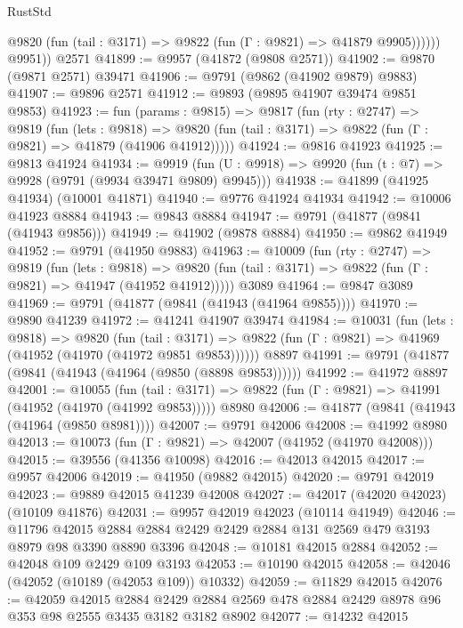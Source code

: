 \begin{lexlean}{RustStd}
\begin{coremodule}
              @9820 (fun (tail : @3171) => @9822 (fun (Γ : @9821) => @41879 @9905))))))
        @9951))
    @2571
@41899 := @9957 (@41872 (@9808 @2571))
@41902 := @9870 (@9871 @2571) @39471
@41906 := @9791 (@9862 (@41902 @9879) @9883)
@41907 := @9896 @2571
@41912 := @9893 (@9895 @41907 @39474 @9851 @9853)
@41923 := fun (params : @9815) =>
  @9817
    (fun (rty : @2747) =>
    @9819
      (fun (lets : @9818) =>
      @9820 (fun (tail : @3171) => @9822 (fun (Γ : @9821) => @41879 (@41906 @41912)))))
@41924 := @9816 @41923
@41925 := @9813 @41924
@41934 := @9919
    (fun (U : @9918) => @9920 (fun (t : @7) => @9928 (@9791 (@9934 @39471 @9809) @9945)))
@41938 := @41899 (@41925 @41934) (@10001 @41871)
@41940 := @9776 @41924 @41934
@41942 := @10006 @41923 @8884
@41943 := @9843 @8884
@41947 := @9791 (@41877 (@9841 (@41943 @9856)))
@41949 := @41902 (@9878 @8884)
@41950 := @9862 @41949
@41952 := @9791 (@41950 @9883)
@41963 := @10009
    (fun (rty : @2747) =>
    @9819
      (fun (lets : @9818) =>
      @9820 (fun (tail : @3171) => @9822 (fun (Γ : @9821) => @41947 (@41952 @41912)))))
    @3089
@41964 := @9847 @3089
@41969 := @9791 (@41877 (@9841 (@41943 (@41964 @9855))))
@41970 := @9890 @41239
@41972 := @41241 @41907 @39474
@41984 := @10031
    (fun (lets : @9818) =>
    @9820
      (fun (tail : @3171) =>
      @9822 (fun (Γ : @9821) => @41969 (@41952 (@41970 (@41972 @9851 @9853))))))
    @8897
@41991 := @9791 (@41877 (@9841 (@41943 (@41964 (@9850 (@8898 @9853))))))
@41992 := @41972 @8897
@42001 := @10055
    (fun (tail : @3171) => @9822 (fun (Γ : @9821) => @41991 (@41952 (@41970 (@41992 @9853)))))
    @8980
@42006 := @41877 (@9841 (@41943 (@41964 (@9850 @8981))))
@42007 := @9791 @42006
@42008 := @41992 @8980
@42013 := @10073 (fun (Γ : @9821) => @42007 (@41952 (@41970 @42008)))
@42015 := @39556 (@41356 @10098)
@42016 := @42013 @42015
@42017 := @9957 @42006
@42019 := @41950 (@9882 @42015)
@42020 := @9791 @42019
@42023 := @9889 @42015 @41239 @42008
@42027 := @42017 (@42020 @42023) (@10109 @41876)
@42031 := @9957 @42019 @42023 (@10114 @41949)
@42046 := @11796
    @42015
    @2884
    @2884
    @2429
    @2429
    @2884
    @131
    @2569
    @479
    @3193
    @8979
    @98
    @3390
    @8890
    @3396
@42048 := @10181 @42015 @2884
@42052 := @42048 @109 @2429 @109 @3193
@42053 := @10190 @42015
@42058 := @42046 (@42052 (@10189 (@42053 @109)) @10332)
@42059 := @11829 @42015
@42076 := @42059
    @42015
    @2884
    @2429
    @2884
    @2569
    @478
    @2884
    @2429
    @8978
    @96
    @353
    @98
    @2555
    @3435
    @3182
    @3182
    @8902
@42077 := @14232 @42015

\end{coremodule}
\end{lexlean}

